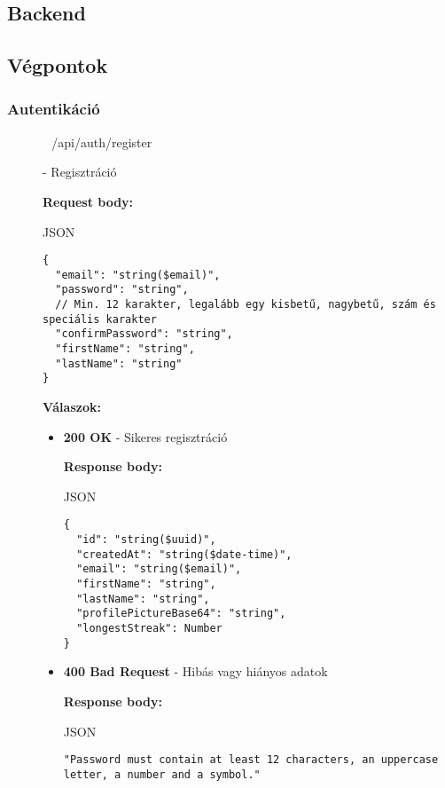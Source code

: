 \documentclass[12pt]{report}
\newcommand{\httpPost}[1]{\colorbox{postColor}{\textbf{\textcolor{white}{POST}}}~#1}
\begin{document}
\begin{itemize}
\chapter{Backend}

\section{Végpontok}

\vspace{0.5cm}
\subsection{Autentikáció}
\begin{description}

  \item [\httpPost{/api/auth/register}] - Regisztráció
  
    \vspace{0.5cm}
    \textbf{Request body:}
    \begin{codeblock}{JSON}
      \begin{verbatim}
{
  "email": "string($email)",
  "password": "string",
  // Min. 12 karakter, legalább egy kisbetű, nagybetű, szám és speciális karakter
  "confirmPassword": "string",
  "firstName": "string",
  "lastName": "string"
}
      \end{verbatim}
    \end{codeblock}

    \vspace{0.5cm}
    \textbf{Válaszok:}
    \begin{itemize}
      \item \textbf{200 OK} - Sikeres regisztráció
      
        \textbf{Response body:}
        \begin{codeblock}{JSON}
          \begin{verbatim}
{
  "id": "string($uuid)",
  "createdAt": "string($date-time)",
  "email": "string($email)",
  "firstName": "string",
  "lastName": "string",
  "profilePictureBase64": "string",
  "longestStreak": Number
}
          \end{verbatim}
        \end{codeblock}

      \item \textbf{400 Bad Request} - Hibás vagy hiányos adatok
      
        \textbf{Response body:}
        \begin{codeblock}{JSON}
          \begin{verbatim}
"Password must contain at least 12 characters, an uppercase letter, a number and a symbol."
          \end{verbatim}
        \end{codeblock}


\end{itemize}
\end{description}
\end{itemize}
\end{document}
